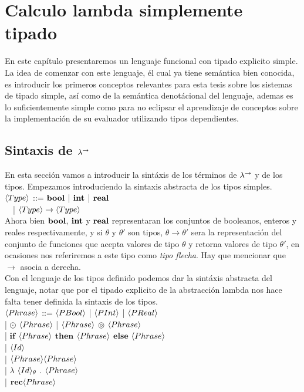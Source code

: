 \chapter{Calculo lambda simplemente tipado}
\label{chap:lambdaarrow}

En este cap\'itulo presentaremos un lenguaje funcional con tipado 
explicito simple. La idea de comenzar con 
este lenguaje, \'el cual ya tiene sem\'antica bien conocida, es introducir
los primeros conceptos relevantes para esta tesis sobre
los sistemas de tipado simple, as\'i
como de la sem\'antica denot\'acional del lenguaje, ademas es lo 
suficientemente simple como para no eclipsar el aprendizaje de 
conceptos sobre la implementaci\'on de su evaluador utilizando
tipos dependientes.

\section{Sintaxis de $\lambda^{\rightarrow}$}

En esta secci\'on vamos a introducir la sint\'axis de los t\'erminos de $\lambda^{\rightarrow}$
y de los tipos. Empezamos introduciendo la sintaxis abstracta de los tipos simples.\\

\noindent
$\langle Type \rangle$ ::= $\textbf{bool}$ | $\textbf{int}$ | $\textbf{real}$\\
\indent \indent \ \
| $\langle Type \rangle \rightarrow \langle Type \rangle$\\

Ahora bien $\textbf{bool}$, $\textbf{int}$ y $\textbf{real}$ representaran 
los conjuntos de booleanos, enteros y reales respectivamente, y si 
$\theta$ y $\theta'$ son tipos,
$\theta \rightarrow \theta'$ sera la representaci\'on del conjunto
de funciones que acepta valores de tipo $\theta$ y retorna valores
de tipo $\theta'$, en ocasiones nos referiremos a este tipo como
\textit{tipo flecha}. Hay que mencionar que $\rightarrow$ asocia a derecha.\\

Con el lenguaje de los tipos definido podemos dar la sint\'axis
abstracta del lenguaje, notar que por el tipado explicito de la abstracci\'on
lambda nos hace falta tener definida la sintaxis de los tipos.\\

\noindent
$\langle Phrase \rangle$ ::= $\langle PBool \rangle$ | $\langle PInt \rangle$ | $\langle PReal \rangle$\\
\indent \indent \indent 
| $\odot$ $\langle Phrase \rangle$ | $\langle Phrase \rangle$ $\circledcirc$ $\langle Phrase \rangle$\\
\indent \indent \indent 
| $\textbf{if}$ $\langle Phrase \rangle$ $\textbf{then}$ $\langle Phrase \rangle$ $\textbf{else}$ $\langle Phrase \rangle$\\
\indent \indent \indent 
| $\langle Id \rangle$\\
\indent \indent \indent 
| $\langle Phrase \rangle\langle Phrase \rangle$\\
\indent \indent \indent 
| $\lambda$ $\langle Id \rangle_\theta$ . $\langle Phrase \rangle$\\
\indent \indent \indent 
| $\textbf{rec} \langle Phrase \rangle$\\

